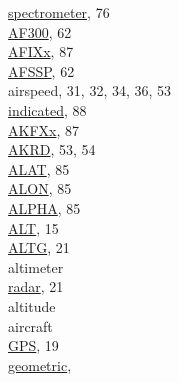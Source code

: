 \documentclass[
]{article}
\begin{document}
\hspace*{0.333em}\hspace*{0.333em}\href{./7-aerosol-particle-measurements.html\#aerosol-spec}{spectrometer},
76\\
\href{./5-cloud-physics-variables.html\#CRPC}{AF300}, 62\\
\href{./10-obsolete-variables.html\#vanes}{AFIXx}, 87\\
\href{./5-cloud-physics-variables.html\#CRPC}{AFSSP}, 62\\
airspeed, 31, 32, 34, 36, 53\\
\hspace*{0.333em}\hspace*{0.333em}\href{./10-obsolete-variables.html\#ias}{indicated},
88\\
\href{./10-obsolete-variables.html\#vanes}{AKFXx}, 87\\
\href{./4-the-state-of-the-atmosphere.html\#akrd}{AKRD}, 53, 54\\
\href{./10-obsolete-variables.html\#ltn51}{ALAT}, 85\\
\href{./10-obsolete-variables.html\#ltn51}{ALON}, 85\\
\href{./10-obsolete-variables.html\#ltn51}{ALPHA}, 85\\
\href{./3-the-state-of-the-aircraft.html\#alt}{ALT}, 15\\
\href{./3-the-state-of-the-aircraft.html\#altg}{ALTG}, 21\\
altimeter\\
\hspace*{0.333em}\hspace*{0.333em}\href{./3-the-state-of-the-aircraft.html\#hgme-159}{radar},
21\\
altitude\\
\hspace*{0.333em}\hspace*{0.333em}aircraft\\
\hspace*{0.333em}\hspace*{0.333em}\hspace*{0.333em}\hspace*{0.333em}\href{./3-the-state-of-the-aircraft.html\#ggalt}{GPS},
19\\
\hspace*{0.333em}\hspace*{0.333em}\hspace*{0.333em}\hspace*{0.333em}\href{./3-the-state-of-the-aircraft.html\#global-positioning-systems}{geometric},
\end{document}
